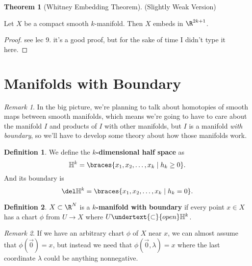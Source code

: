 \documentclass[a5paper]{article}
\theoremstyle{definition}%
\newtheorem{theorem}{Theorem}
\newtheorem*{definition*}{Definition}
\numberwithin{exercise}{section}
\theoremstyle{remark}%
\newtheorem*{remark*}{Remark}
\newcommand{\subsetopen}{\undertext{\subset}{open}}
\begin{document}
\begin{highlight}
\begin{theorem}[Whitney Embedding Theorem](Slightly Weak Version)

Let $X$ be a compact\footnotemark{} smooth $k$-manifold. Then $X$ embeds in $\R^{2k+1}$. 
\end{theorem}
\end{highlight}
\begin{proof}
see lec 9. it's a good proof, but for the sake of time I didn't type it here. 
\end{proof}

\section{Manifolds with Boundary}

\begin{remark*}
In the big picture, we're planning to talk about homotopies of smooth maps between smooth manifolds, which means we're going to have to care about the manifold $I$ and products of $I$ with other manifolds, but $I$ is a manifold \textit{with boundary}, so we'll have to develop some theory about how those manifolds work. 
\end{remark*}

\renewcommand{\H}{\mathbb{H}}
\begin{highlight}
\begin{definition*}
We define the \textbf{$k$-dimensional half space} as
$$\H^k=\braces{x_1, x_2, \dots, x_k \mid h_k\geq0}.$$
And its boundary is
$$\del \H^k=\braces{x_1, x_2, \dots, x_k \mid h_k=0}.$$
\end{definition*}
\end{highlight}

\begin{highlight}
\begin{definition*}
$X\subset \R^N$ is a \textbf{$k$-manifold with boundary} if every point $x\in X$ has a chart $\phi$ from $U\to X$ where $U\subsetopen \H^k$. 
\end{definition*}
\end{highlight}

\begin{remark*}
If we have an arbitrary chart $\phi$ of $X$ near $x$, we can almost assume \Wlog{} that $\phi(\vec 0)=x$, but instead we need that $\phi(\vec 0,\lambda)=x$ where the last coordinate $\lambda$ could be anything nonnegative. 
\end{remark*}
\end{document}
